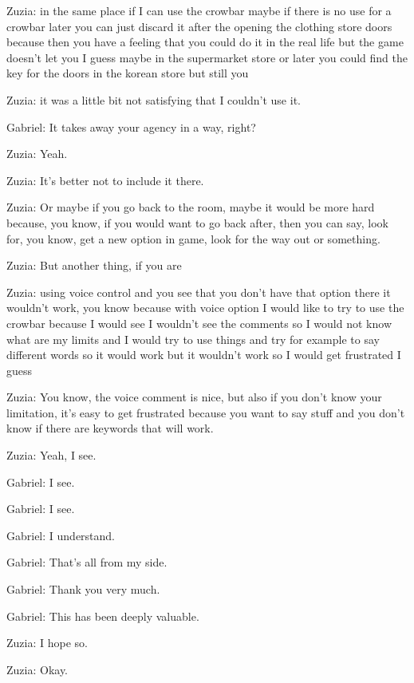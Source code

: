 Zuzia: in the same place if I can use the crowbar maybe if there is no use for a crowbar later you can just discard it after the opening the clothing store doors because then you have a feeling that you could do it in the real life but the game doesn't let you I guess maybe in the supermarket store or later you could find the key for the doors in the korean store but still you

Zuzia: it was a little bit not satisfying that I couldn't use it.

Gabriel: It takes away your agency in a way, right?

Zuzia: Yeah.

Zuzia: It's better not to include it there.

Zuzia: Or maybe if you go back to the room, maybe it would be more hard because, you know, if you would want to go back after, then you can say, look for, you know, get a new option in game, look for the way out or something.

Zuzia: But another thing, if you are

Zuzia: using voice control and you see that you don't have that option there it wouldn't work, you know because with voice option I would like to try to use the crowbar because I would see I wouldn't see the comments so I would not know what are my limits and I would try to use things and try for example to say different words so it would work but it wouldn't work so I would get frustrated I guess

Zuzia: You know, the voice comment is nice, but also if you don't know your limitation, it's easy to get frustrated because you want to say stuff and you don't know if there are keywords that will work.

Zuzia: Yeah, I see.

Gabriel: I see.

Gabriel: I see.

Gabriel: I understand.

Gabriel: That's all from my side.

Gabriel: Thank you very much.

Gabriel: This has been deeply valuable.

Zuzia: I hope so.

Zuzia: Okay.





